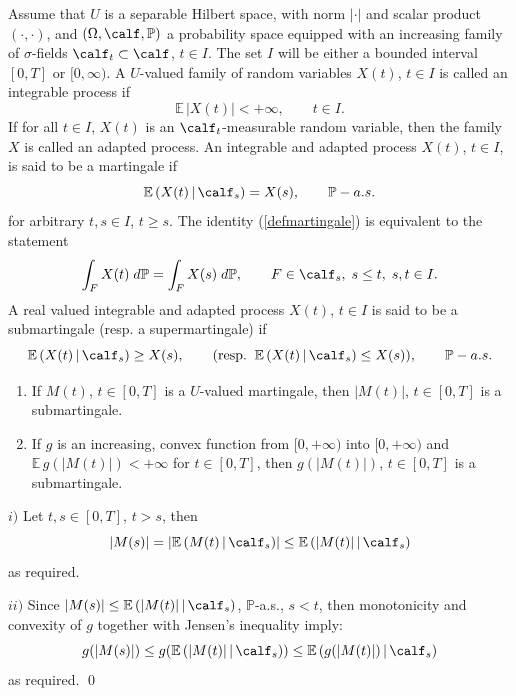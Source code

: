 \documentclass[preprint]{imsart}
\def\P{\mathbb P}
\def\E{\mathbb E}
\begin{document}
{Assume that $U$ is a separable Hilbert space,
with norm $|\cdot|$ and scalar product $(\cdot,\cdot)$,
and $(\Omega, \calf, \P)$ a probability space equipped with an
increasing family of $\sigma$-fields $\calf_t\subset\calf$,
$t\in I$. The set $I$ will be either a bounded interval $[0,T]$ or
$[0,\infty)$. A $U$-valued family of random variables $X(t)$,
$t\in I$ is called an integrable process if
\begin{equation}\label{integrproc}
  \E\, |X(t)|<+\infty,\qquad t\in I.
\end{equation}
If for all $t\in I$, $X(t)$ is an $\calf_t$-measurable random
variable, then the family $X$ is called an adapted process. An
integrable and adapted process $X(t)$, $t\in I$, is said to be a
martingale if
\begin{equation}\label{defmartingale}
  \E\, (X(t)\, |\, \calf_s)=X(s),\qquad
  \P-a.s.
\end{equation}
for arbitrary $t,s\in I$, $t\geq s$. The identity
(\ref{defmartingale}) is equivalent to the statement
\begin{equation}\label{defmartingaleequiv}
  \int_FX(t)\;d\P=  \int_FX(s)\;d\P,\qquad
  F\in \calf_s,\; s\leq t, \; s,t\in I.
\end{equation}
A real valued integrable and adapted process
$X(t)$, $t\in I$ is said to be a submartingale (resp. a
supermartingale) if
$$
  \E\, (X(t)\, |\, \calf_s)\geq X(s),
\qquad {\rm (resp.\;\;}
  \E\, (X(t)\, |\, \calf_s)\leq X(s)
  {\rm )},\qquad
  \P-a.s.
$$


\begin{Lemma}
\begin{enumerate}
  \item[i)] If $M(t)$, $t\in [0,T]$ is a $U$-valued martingale,
  then $|M(t)|$, $t\in [0,T]$ is a submartingale.
  \item[ii)] If $g$ is an increasing, convex function from
  $[0,+\infty)$ into   $[0,+\infty)$ and $\E\, g(|M(t)|)<+\infty$
  for $t\in [0,T]$, then $g(|M(t)|)$, $t\in [0,T]$ is a
  submartingale.
\end{enumerate}
\end{Lemma}


$i)$ Let $t,s\in [0,T]$, $t>s$, then
$$
|M(s)|=|\E\, (M(t)\,|\,\calf_s)|\leq
\E\, (|M(t)|\,|\,\calf_s)
$$
as required.

$ii)$ Since $|M(s)|\leq\E\, (|M(t)|\,|\,\calf_s)$,
$\P$-a.s., $s<t$, then monotonicity and convexity
of $g$ together with Jensen's inequality imply:
\begin{equation}\label{convmart}
  g(|M(s)|)\leq   g(\E\, (|M(t)|\,|\,\calf_s))\leq
\E\,(  g (|M(t)|)\,|\,\calf_s)
\end{equation}
as required. \qed

}
\end{document}
